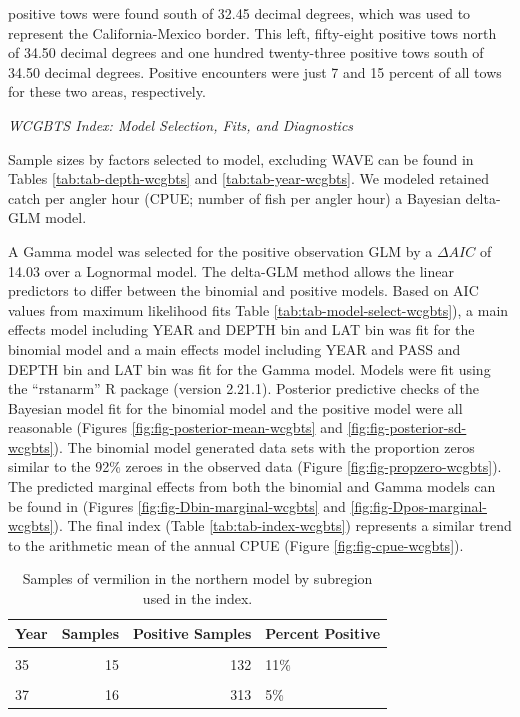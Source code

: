 \documentclass[
  english,
  a4paper,
]{article}
\begin{document}
positive tows were found south of 32.45 decimal degrees,
which was used to represent the California-Mexico border.
This left,
fifty-eight
positive tows north of 34.50 decimal degrees and
one hundred twenty-three
positive tows south of 34.50 decimal degrees.
Positive encounters were just
7 and 15
percent of all tows for these two areas, respectively.

\emph{WCGBTS Index: Model Selection, Fits, and Diagnostics}

Sample sizes by factors selected to model, excluding WAVE can be found in Tables
\ref{tab:tab-depth-wcgbts} and \ref{tab:tab-year-wcgbts}.
We modeled retained catch per angler hour (CPUE; number of fish per angler hour)
a Bayesian delta-GLM model.

A Gamma model was
selected for the positive observation GLM by
a \(\Delta AIC\) of 14.03
over a Lognormal model.
The delta-GLM
method allows the linear predictors to differ between the binomial and positive models.
Based on AIC values from maximum likelihood fits Table \ref{tab:tab-model-select-wcgbts}),
a main effects model including
YEAR and DEPTH bin and LAT bin
was fit for the binomial model and a main
effects model including
YEAR and PASS and DEPTH bin and LAT bin
was fit for the Gamma model.
Models were fit using the ``rstanarm'' R package (version 2.21.1). Posterior predictive
checks of the Bayesian model fit for the binomial model and the positive model
were all reasonable (Figures \ref{fig:fig-posterior-mean-wcgbts} and
\ref{fig:fig-posterior-sd-wcgbts}). The binomial model generated data sets with the
proportion zeros similar to the 92\% zeroes in the observed data
(Figure \ref{fig:fig-propzero-wcgbts}). The predicted marginal effects from
both the binomial and Gamma models can be found in (Figures \ref{fig:fig-Dbin-marginal-wcgbts} and \ref{fig:fig-Dpos-marginal-wcgbts}). The
final index (Table \ref{tab:tab-index-wcgbts})
represents a similar trend to the arithmetic mean of the annual CPUE (Figure \ref{fig:fig-cpue-wcgbts}).

\newpage

\begin{table}

\caption{\label{tab:tab-region-wcgbts}Samples of vermilion in the northern model by subregion used in the index.}
\centering
\begin{tabular}[t]{lrrl}
\toprule
Year & Samples & Positive Samples & Percent Positive\\
\midrule
\cellcolor{gray!6}{34} & \cellcolor{gray!6}{12} & \cellcolor{gray!6}{125} & \cellcolor{gray!6}{10\%}\\
35 & 15 & 132 & 11\%\\
\cellcolor{gray!6}{36} & \cellcolor{gray!6}{13} & \cellcolor{gray!6}{113} & \cellcolor{gray!6}{12\%}\\
37 & 16 & 313 & 5\%\\
\bottomrule
\end{tabular}
\end{table}
\end{document}
